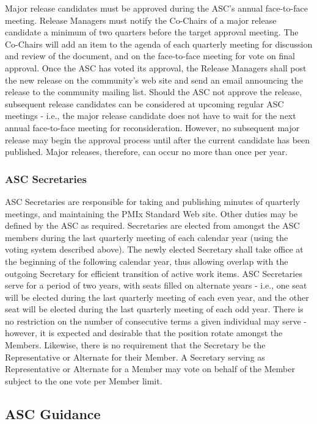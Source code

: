 \documentclass{article}
\begin{document}
Major release candidates must be approved during the ASC's annual
face-to-face meeting. Release Managers must notify the Co-Chairs of a
major release candidate a minimum of two quarters before the target
approval meeting. The Co-Chairs will add an item to the agenda of each
quarterly meeting for discussion and review of the document, and on the
face-to-face meeting for vote on final approval. Once the ASC has voted
its approval, the Release Managers shall post the new release on the
community's web site and send an email announcing the release to the
community mailing list. Should the ASC not approve the release,
subsequent release candidates can be considered at upcoming regular ASC
meetings - i.e., the major release candidate does not have to wait for
the next annual face-to-face meeting for reconsideration. However, no
subsequent major release may begin the approval process until after the
current candidate has been published. Major releases, therefore, can
occur no more than once per year.

\hypertarget{asc-secretaries}{%
\subsubsection{ASC Secretaries}\label{asc-secretaries}}

ASC Secretaries are responsible for taking and publishing minutes of
quarterly meetings, and maintaining the PMIx Standard Web site. Other
duties may be defined by the ASC as required. Secretaries are elected
from amongst the ASC members during the last quarterly meeting of each
calendar year (using the voting system described above). The newly
elected Secretary shall take office at the beginning of the following
calendar year, thus allowing overlap with the outgoing Secretary for
efficient transition of active work items. ASC Secretaries serve for a
period of two years, with seats filled on alternate years - i.e., one
seat will be elected during the last quarterly meeting of each even
year, and the other seat will be elected during the last quarterly
meeting of each odd year. There is no restriction on the number of
consecutive terms a given individual may serve - however, it is expected
and desirable that the position rotate amongst the Members. Likewise,
there is no requirement that the Secretary be the Representative or
Alternate for their Member. A Secretary serving as Representative or
Alternate for a Member may vote on behalf of the Member subject to the
one vote per Member limit.

\hypertarget{asc-guidance}{%
\subsection{ASC Guidance}\label{asc-guidance}}
\end{document}
